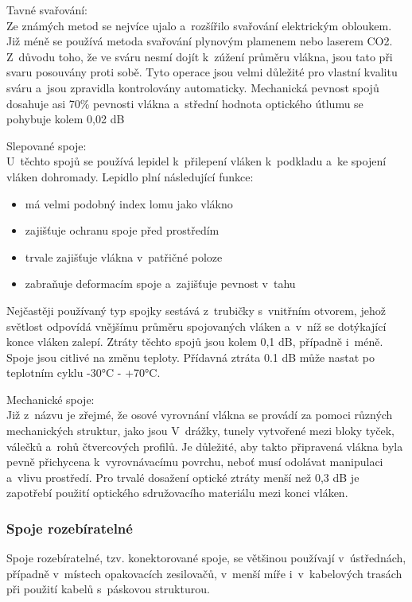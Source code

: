 Tavné svařování: \\
Ze známých metod se nejvíce ujalo a~rozšířilo svařování elektrickým obloukem. Již méně se používá metoda svařování plynovým plamenem nebo laserem CO2. Z~důvodu toho, že ve sváru nesmí dojít k~zúžení průměru vlákna, jsou tato při svaru posouvány proti sobě. Tyto operace jsou velmi důležité pro vlastní kvalitu sváru a~jsou zpravidla kontrolovány automaticky. Mechanická pevnost spojů dosahuje asi 70\% pevnosti vlákna a~střední hodnota optického útlumu se pohybuje kolem 0,02 dB

Slepované spoje:\\
U~těchto spojů se používá lepidel k~přilepení vláken k~podkladu a~ke spojení vláken dohromady. Lepidlo plní následující funkce:
\begin{itemize}
  \item má velmi podobný index lomu jako vlákno
  \item zajišťuje ochranu spoje před prostředím
  \item trvale zajišťuje vlákna v~patřičné poloze
  \item zabraňuje deformacím spoje a~zajišťuje pevnost v~tahu
\end{itemize}
Nejčastěji používaný typ spojky sestává z~trubičky s~vnitřním otvorem, jehož světlost odpovídá vnějšímu průměru spojovaných vláken a~v~níž se dotýkající konce vláken zalepí. Ztráty těchto spojů jsou kolem 0,1 dB, případně i~méně. Spoje jsou citlivé na změnu
teploty. Přídavná ztráta 0.1 dB může nastat po teplotním cyklu -30°C - +70°C.

Mechanické spoje: \\
Již z~názvu je zřejmé, že osové vyrovnání vlákna se provádí za pomoci různých mechanických struktur, jako jsou V~drážky, tunely vytvořené mezi bloky tyček, válečků a~rohů čtvercových profilů. Je důležité, aby takto připravená vlákna byla pevně přichycena k~vyrovnávacímu povrchu, neboť musí odolávat manipulaci a~vlivu prostředí. Pro trvalé dosažení optické ztráty menší než 0,3 dB je zapotřebí použití optického sdružovacího materiálu mezi konci vláken.

\subsubsection{Spoje rozebíratelné}
Spoje rozebíratelné, tzv. konektorované spoje, se většinou používají v~ústřednách, případně v~místech opakovacích zesilovačů, v~menší míře i~v~kabelových trasách při použití kabelů s~páskovou strukturou.

